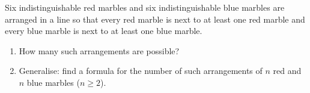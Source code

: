 Six indistinguishable red marbles and six indistinguishable blue marbles are arranged in a line so that every red marble is next to at least one red marble and every blue marble is next to at least one blue marble.
\begin{enumerate}
\item[(a)] How many such arrangements are possible?
\item[(b)] Generalise: find a formula for the number of such arrangements of $n$ red and $n$ blue marbles ($n\ge2$).
\end{enumerate}
